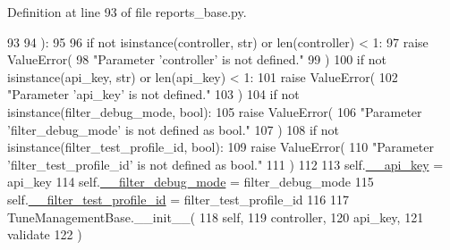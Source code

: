 Definition at line 93 of file reports\-\_\-base.\-py.


\begin{DoxyCode}
93 
94         ):
95 
96         \textcolor{keywordflow}{if} \textcolor{keywordflow}{not} isinstance(controller, str) \textcolor{keywordflow}{or} len(controller) < 1:
97             \textcolor{keywordflow}{raise} ValueError(
98                 \textcolor{stringliteral}{"Parameter 'controller' is not defined."}
99             )
100         \textcolor{keywordflow}{if} \textcolor{keywordflow}{not} isinstance(api\_key, str) \textcolor{keywordflow}{or} len(api\_key) < 1:
101             \textcolor{keywordflow}{raise} ValueError(
102                 \textcolor{stringliteral}{"Parameter 'api\_key' is not defined."}
103             )
104         \textcolor{keywordflow}{if} \textcolor{keywordflow}{not} isinstance(filter\_debug\_mode, bool):
105             \textcolor{keywordflow}{raise} ValueError(
106                 \textcolor{stringliteral}{"Parameter 'filter\_debug\_mode' is not defined as bool."}
107             )
108         \textcolor{keywordflow}{if} \textcolor{keywordflow}{not} isinstance(filter\_test\_profile\_id, bool):
109             \textcolor{keywordflow}{raise} ValueError(
110                 \textcolor{stringliteral}{"Parameter 'filter\_test\_profile\_id' is not defined as bool."}
111             )
112 
113         self.\hyperlink{classtune_1_1management_1_1reports_1_1reports__base_1_1ReportsBase_a11cc8a3041bc8b00d69f19c743db691c}{\_\_api\_key} = api\_key
114         self.\hyperlink{classtune_1_1management_1_1reports_1_1reports__base_1_1ReportsBase_a90eca5e0c1887df285f34643969652a1}{\_\_filter\_debug\_mode} = filter\_debug\_mode
115         self.\hyperlink{classtune_1_1management_1_1reports_1_1reports__base_1_1ReportsBase_a00dede100fc4e3a6468f15a057bfc1c1}{\_\_filter\_test\_profile\_id} = filter\_test\_profile\_id
116 
117         TuneManagementBase.\_\_init\_\_(
118             self,
119             controller,
120             api\_key,
121             validate
122             )

\end{DoxyCode}


